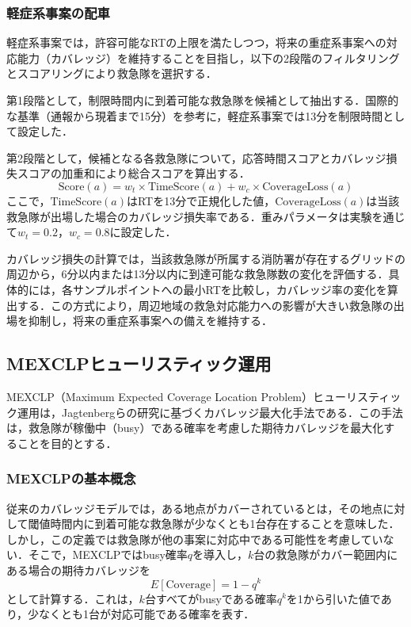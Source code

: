 \subsubsection{軽症系事案の配車}
軽症系事案では，許容可能なRTの上限を満たしつつ，将来の重症系事案への対応能力（カバレッジ）を維持することを目指し，以下の2段階のフィルタリングとスコアリングにより救急隊を選択する．

第1段階として，制限時間内に到着可能な救急隊を候補として抽出する．国際的な基準（通報から現着まで15分）を参考に，軽症系事案では13分を制限時間として設定した．

第2段階として，候補となる各救急隊について，応答時間スコアとカバレッジ損失スコアの加重和により総合スコアを算出する．
\begin{equation}
  \mathrm{Score}(a) = w_t \times \mathrm{TimeScore}(a) + w_c \times \mathrm{CoverageLoss}(a)
\end{equation}
ここで，$\mathrm{TimeScore}(a)$はRTを13分で正規化した値，$\mathrm{CoverageLoss}(a)$は当該救急隊が出場した場合のカバレッジ損失率である．重みパラメータは実験を通じて$w_t = 0.2$，$w_c = 0.8$に設定した．

カバレッジ損失の計算では，当該救急隊が所属する消防署が存在するグリッドの周辺から，6分以内または13分以内に到達可能な救急隊数の変化を評価する．具体的には，各サンプルポイントへの最小RTを比較し，カバレッジ率の変化を算出する．この方式により，周辺地域の救急対応能力への影響が大きい救急隊の出場を抑制し，将来の重症系事案への備えを維持する．


\subsection{MEXCLPヒューリスティック運用}
MEXCLP（Maximum Expected Coverage Location Problem）ヒューリスティック運用は，Jagtenbergらの研究\cite{Jagtenberg2017}に基づくカバレッジ最大化手法である．この手法は，救急隊が稼働中（busy）である確率を考慮した期待カバレッジを最大化することを目的とする．

\subsubsection{MEXCLPの基本概念}
従来のカバレッジモデルでは，ある地点がカバーされているとは，その地点に対して閾値時間内に到着可能な救急隊が少なくとも1台存在することを意味した．しかし，この定義では救急隊が他の事案に対応中である可能性を考慮していない．そこで，MEXCLPではbusy確率$q$を導入し，$k$台の救急隊がカバー範囲内にある場合の期待カバレッジを
\[
  E[\mathrm{Coverage}] = 1 - q^k
\]
として計算する．これは，$k$台すべてがbusyである確率$q^k$を1から引いた値であり，少なくとも1台が対応可能である確率を表す．

